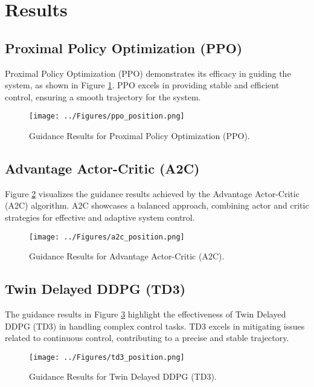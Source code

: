 \documentclass[conference]{IEEEtran}
\begin{document}
\section{Results}

\subsection{Proximal Policy Optimization (PPO)}
Proximal Policy Optimization (PPO) demonstrates its efficacy in guiding the system, as shown in Figure \ref{fig:ppo}. PPO excels in providing stable and efficient control, ensuring a smooth trajectory for the system.

\begin{figure}[H]
    \centering
    \texttt{[image: ../Figures/ppo\_position.png]}
    \caption{Guidance Results for Proximal Policy Optimization (PPO).}
    \label{fig:ppo}
\end{figure}

\subsection{Advantage Actor-Critic (A2C)}
Figure \ref{fig:a2c} visualizes the guidance results achieved by the Advantage Actor-Critic (A2C) algorithm. A2C showcases a balanced approach, combining actor and critic strategies for effective and adaptive system control.

\begin{figure}[H]
    \centering
    \texttt{[image: ../Figures/a2c\_position.png]}
    \caption{Guidance Results for Advantage Actor-Critic (A2C).}
    \label{fig:a2c}
\end{figure}

\subsection{Twin Delayed DDPG (TD3)}
The guidance results in Figure \ref{fig:td3} highlight the effectiveness of Twin Delayed DDPG (TD3) in handling complex control tasks. TD3 excels in mitigating issues related to continuous control, contributing to a precise and stable trajectory.

\begin{figure}[H]
    \centering
    \texttt{[image: ../Figures/td3\_position.png]}
    \caption{Guidance Results for Twin Delayed DDPG (TD3).}
    \label{fig:td3}
\end{figure}
\end{document}
